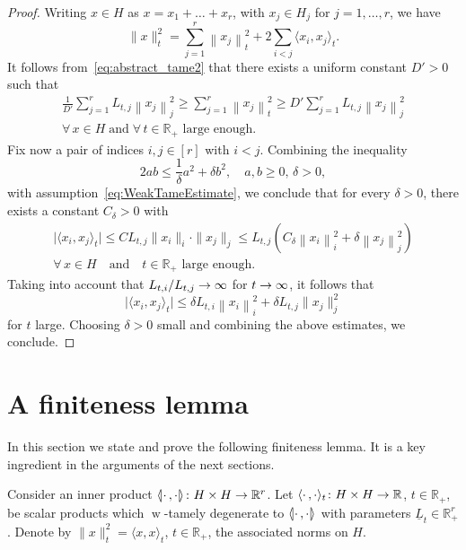 \documentclass[AHL,Unicode,longabstracts]{cedram}
\newcommand{\innone}[2]{{\langle#2\rangle_{#1}}}
\newcommand{\llangle}{\mathopen{\langle\mkern -3.1mu\lvert}}
\newcommand{\rrangle}{\mathclose{\rvert\mkern -3.1mu\rangle}}
\newcommand{\highinn}[2]{{\llangle#2\rrangle_{#1}}}
\newcommand{\norm}[1]{\|#1\|}
\newcommand{\normsq}[1]{\|#1\|^{2}}
\newcommand{\normbsq}[1]{\left\|#1\right\|^{2}}
\newcommand{\abs}[1]{\lvert #1\rvert}
\DeclareMathOperator{\weak}{w}
\newcommand{\R}{\mathbb{R}}
\renewcommand*{\to}{\mathchoice{\longrightarrow}{\rightarrow}{\rightarrow}{\rightarrow}}
\let\oldforall\forall
\renewcommand*{\forall}{\mathrel{\oldforall}}
\begin{document}
\begin{proof}
Writing $x \in H$ as $x = x_1+ \dots + x_r$, with $x_j\in H_j$ for $j=1, \dots, r$, we have
\[
\normsq{x}_t = \sum_{j=1}^r \normbsq{x_j}_t + 2 \sum_{i <j} \innone{t}{x_i, x_j}.
\]
It follows from~\eqref{eq:abstract_tame2} that there exists a uniform constant $D' >0$ such that
\begin{multline*}
\frac 1{D'} \sum_{j=1}^r L_{t,j} \normbsq{x_j}_j \ge \sum_{j=1}^r \normbsq{x_j}_t \ge D' \sum_{j=1}^r L_{t,j} \normbsq{x_j}_j \\
\forall \, x\in H \;\text{and}\; \forall\, t\in \R_+ \text{ large enough}.
\end{multline*}
Fix now a pair of indices $i,j\in [r]$ with $i<j$. Combining the inequality
\begin{equation}\label{eq:trick}
2 ab \le\frac{1}{\delta} a^2 + \delta b^2, \quad a,b \ge 0, \, \delta >0,
\end{equation}
with assumption~\eqref{eq:WeakTameEstimate}, we conclude that for every $\delta >0$, there exists a constant $C_\delta >0$ with
\begin{multline*}
\abs{\innone{t}{x_i, x_j}} \le C L_{t,j} \norm{x_i}_i \cdot \norm{x_j}_j \le L_{t,j}\left(C_\delta \normbsq{x_i}_i + \delta \normbsq{x_j}_j\right) \\ 
\forall \, x\in H \quad\text{and}\quad t \in \R_+ \text{ large enough}.
\end{multline*}
Taking into account that $L_{t,i} /L_{t,j} \to \infty$ for $t \to \infty$, it follows that
\[
\abs{\innone{t}{x_i, x_j}} \le \delta L_{t,i} \normbsq{x_i}_i + \delta L_{t,j} \normsq{x_j}_j
\]
for $t$ large. Choosing $\delta >0$ small and combining the above estimates, we conclude.
\end{proof}



\section{A finiteness lemma} \label{sec:FinitenessLemma}
In this section we state and prove the following finiteness lemma. It is a key ingredient in the arguments of the next sections.

Consider an inner product $\highinn{}{\cdot\,,\cdot} \colon H\times H \to \R^r$. Let $\innone{t}{\cdot\,,\cdot} \colon H\times H \to \R$, $t\in \R_+$, be scalar products which $\weak$-tamely degenerate to $\highinn{}{\cdot\,,\cdot}$ with parameters $\underline L_t \in \R_+^r$. Denote by $\norm{x}_t^2 = \innone{t}{x,x}$, $t \in \R_+$, the associated norms on $H$.
\end{document}
